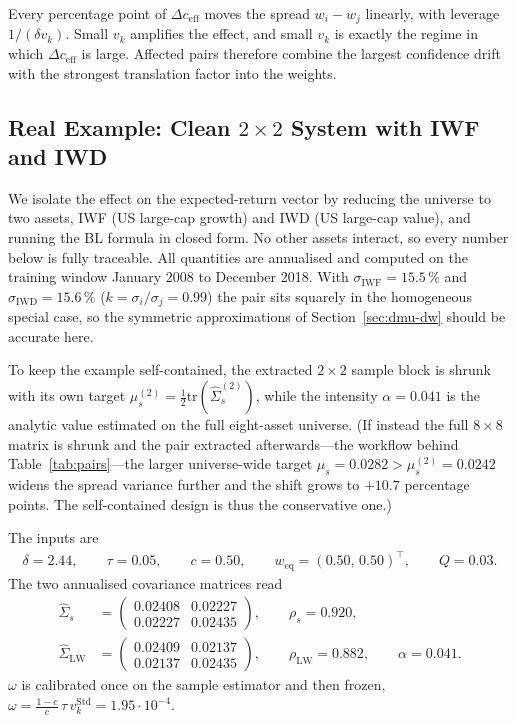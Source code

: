 \documentclass[a4paper,11pt]{article}
\theoremstyle{plain}
\theoremstyle{definition}
\newcommand{\Std}{\mathrm{Std}}
\newcommand{\LW}{\mathrm{LW}}
\newcommand{\eff}{\mathrm{eff}}
\begin{document}
Every percentage point of $\Delta c_{\eff}$ moves the spread
$w_i - w_j$ linearly, with leverage $1/(\delta v_k)$. Small $v_k$
amplifies the effect, and small $v_k$ is exactly the regime in which
$\Delta c_{\eff}$ is large. Affected pairs therefore combine the largest
confidence drift with the strongest translation factor into the weights.

\subsection{Real Example: Clean $2\times 2$ System with IWF and IWD}
\label{sec:example}

We isolate the effect on the expected-return vector by reducing the
universe to two assets, IWF (US large-cap growth) and IWD (US large-cap
value), and running the BL formula in closed form. No other assets
interact, so every number below is fully traceable. All quantities are
annualised and computed on the training window January 2008 to December
2018. With $\sigma_{\mathrm{IWF}} = 15.5\,\%$ and
$\sigma_{\mathrm{IWD}} = 15.6\,\%$ ($k = \sigma_i/\sigma_j = 0.99$) the
pair sits squarely in the homogeneous special case, so the symmetric
approximations of Section~\ref{sec:dmu-dw} should be accurate here.

To keep the example self-contained, the extracted $2\times 2$ sample
block is shrunk with its own target
$\mu_s^{(2)} = \tfrac{1}{2}\mathrm{tr}(\hat\Sigma_s^{(2)})$, while the
intensity $\alpha = 0.041$ is the analytic value estimated on the full
eight-asset universe. (If instead the full $8\times 8$ matrix is shrunk
and the pair extracted afterwards---the workflow behind
Table~\ref{tab:pairs}---the larger universe-wide target
$\mu_s = 0.0282 > \mu_s^{(2)} = 0.0242$ widens the spread variance
further and the shift grows to $+10.7$ percentage points. The
self-contained design is thus the conservative one.)

The inputs are
\begin{align*}
    \delta = 2.44, \qquad \tau = 0.05, \qquad c = 0.50, \qquad
    w_{\mathrm{eq}} = (0.50,\,0.50)^\top, \qquad Q = 0.03.
\end{align*}
The two annualised covariance matrices read
\begin{align*}
    \hat{\Sigma}_s &= \begin{pmatrix} 0.02408 & 0.02227 \\ 0.02227 & 0.02435 \end{pmatrix},
    \qquad \rho_s = 0.920,\\
    \hat{\Sigma}_{\LW} &= \begin{pmatrix} 0.02409 & 0.02137 \\ 0.02137 & 0.02435 \end{pmatrix},
    \qquad \rho_{\LW} = 0.882, \qquad \alpha = 0.041.
\end{align*}
$\omega$ is calibrated once on the sample estimator and then frozen,
$\omega = \tfrac{1-c}{c}\,\tau\,v_k^\Std = 1.95 \cdot 10^{-4}$.
\end{document}
